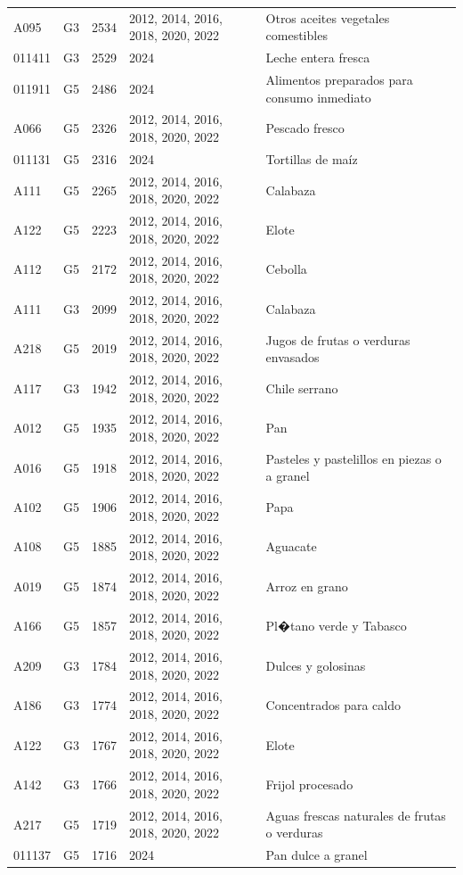 \begin{table}[ht]
\begin{tabular}{llrll}
  A095 & G3 & 2534 & 2012, 2014, 2016, 2018, 2020, 2022 & Otros aceites vegetales comestibles \\ 
  011411 & G3 & 2529 & 2024 & Leche entera fresca \\ 
  011911 & G5 & 2486 & 2024 & Alimentos preparados para consumo inmediato \\ 
  A066 & G5 & 2326 & 2012, 2014, 2016, 2018, 2020, 2022 & Pescado fresco \\ 
  011131 & G5 & 2316 & 2024 & Tortillas de maíz \\ 
  A111 & G5 & 2265 & 2012, 2014, 2016, 2018, 2020, 2022 & Calabaza \\ 
  A122 & G5 & 2223 & 2012, 2014, 2016, 2018, 2020, 2022 & Elote \\ 
  A112 & G5 & 2172 & 2012, 2014, 2016, 2018, 2020, 2022 & Cebolla \\ 
  A111 & G3 & 2099 & 2012, 2014, 2016, 2018, 2020, 2022 & Calabaza \\ 
  A218 & G5 & 2019 & 2012, 2014, 2016, 2018, 2020, 2022 & Jugos de frutas o verduras envasados \\ 
  A117 & G3 & 1942 & 2012, 2014, 2016, 2018, 2020, 2022 & Chile serrano \\ 
  A012 & G5 & 1935 & 2012, 2014, 2016, 2018, 2020, 2022 & Pan \\ 
  A016 & G5 & 1918 & 2012, 2014, 2016, 2018, 2020, 2022 & Pasteles y pastelillos en piezas o a granel \\ 
  A102 & G5 & 1906 & 2012, 2014, 2016, 2018, 2020, 2022 & Papa \\ 
  A108 & G5 & 1885 & 2012, 2014, 2016, 2018, 2020, 2022 & Aguacate \\ 
  A019 & G5 & 1874 & 2012, 2014, 2016, 2018, 2020, 2022 & Arroz en grano \\ 
  A166 & G5 & 1857 & 2012, 2014, 2016, 2018, 2020, 2022 & Pl�tano verde y Tabasco \\ 
  A209 & G3 & 1784 & 2012, 2014, 2016, 2018, 2020, 2022 & Dulces y golosinas \\ 
  A186 & G3 & 1774 & 2012, 2014, 2016, 2018, 2020, 2022 & Concentrados para caldo \\ 
  A122 & G3 & 1767 & 2012, 2014, 2016, 2018, 2020, 2022 & Elote \\ 
  A142 & G3 & 1766 & 2012, 2014, 2016, 2018, 2020, 2022 & Frijol procesado \\ 
  A217 & G5 & 1719 & 2012, 2014, 2016, 2018, 2020, 2022 & Aguas frescas naturales de frutas o verduras \\ 
  011137 & G5 & 1716 & 2024 & Pan dulce a granel \\ 

\end{tabular}
\end{table}
